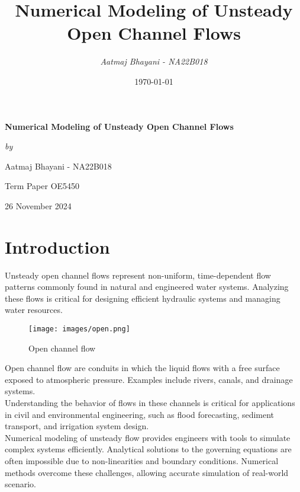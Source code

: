 \documentclass{article}
\title{\textbf{\Large{Numerical Modeling of Unsteady Open Channel Flows}}}
\author{\textit{Aatmaj Bhayani - NA22B018}} %
\date{\today} %
\begin{document}
\begin{titlepage}
    \centering
    \vspace*{2cm} %
    {\Huge \textbf{Numerical Modeling of Unsteady Open Channel Flows} \par}
    \vspace{1cm}
    {\Large \textit{by} \par}
    \vspace{0.5cm}
    {\Large Aatmaj Bhayani - NA22B018 \par}
    \vfill
    {\large Term Paper OE5450 \par}
    \vspace{1cm}
    {\large 26 November 2024 \par}
\end{titlepage}

\section{Introduction}

Unsteady open channel flows represent non-uniform, time-dependent flow patterns commonly found in natural and 
engineered water systems. Analyzing these flows is critical for designing efficient hydraulic systems and 
managing water resources. \\

\begin{figure}[H]
    \centering
    \texttt{[image: images/open.png]}
    \caption{Open channel flow}
    \label{fig:sample}
\end{figure}

Open channel flow are conduits  in which the liquid flows with a free surface exposed to atmospheric pressure. 
Examples include rivers, canals, and drainage systems. \\

Understanding the behavior 
of flows in these channels is critical for applications in civil and environmental engineering, such as flood 
forecasting, sediment transport, and irrigation system design.\\

Numerical modeling of unsteady flow provides engineers with tools to simulate complex systems efficiently. Analytical 
solutions to the governing equations are often impossible due to non-linearities and boundary conditions. 
Numerical methods overcome these challenges, allowing accurate simulation of real-world scenario.\\
\end{document}
